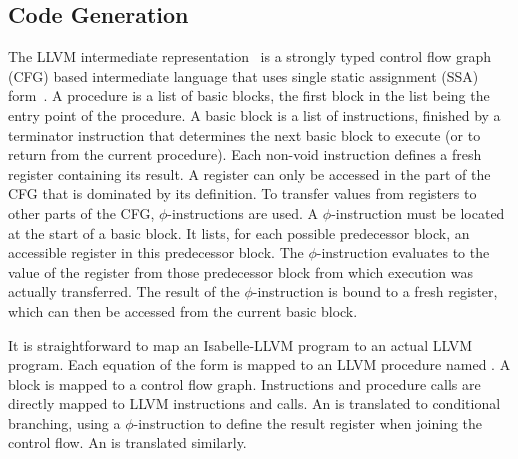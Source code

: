 \documentclass[a4paper,USenglish,cleveref, autoref]{lipics-v2019}
\begin{document}
\subsection{Code Generation}
The LLVM intermediate representation~\cite{LLVM-manual} is a strongly typed control flow graph (CFG) based intermediate language 
that uses single static assignment (SSA) form~\cite{CFRWZ91}.
A procedure is a list of basic blocks, the first block in the list being the entry point of the procedure. 
A basic block is a list of instructions, finished by a terminator instruction that determines the next basic block to execute (or to return from the current procedure).
Each non-void instruction defines a fresh register containing its result. A register can only be accessed in the part of the CFG that is dominated by its definition.
To transfer values from registers to other parts of the CFG, $\phi$-instructions are used. 
A $\phi$-instruction must be located at the start of a basic block. 
It lists, for each possible predecessor block, an accessible register in this predecessor block. 
The $\phi$-instruction evaluates to the value of the register from those predecessor block from which execution was actually transferred. 
The result of the $\phi$-instruction is bound to a fresh register, which can then be accessed from the current basic block.


It is straightforward to map an Isabelle-LLVM program to an actual LLVM program.
Each equation of the form  is mapped to an LLVM procedure named . 
A block is mapped to a control flow graph. Instructions and procedure calls are directly mapped to LLVM instructions and calls.
An  is translated to conditional branching, using a $\phi$-instruction to define the result register  when joining the control flow.
An  is translated similarly. 
\end{document}
